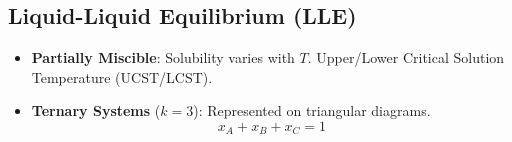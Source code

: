 \subsection{Liquid-Liquid Equilibrium (LLE)}
\begin{itemize}
    \item \textbf{Partially Miscible}: Solubility varies with $T$. Upper/Lower Critical Solution Temperature (UCST/LCST).
    \item \textbf{Ternary Systems} ($k=3$): Represented on triangular diagrams.
    \begin{equation}
        x_A + x_B + x_C = 1
    \end{equation}
\end{itemize}
\vspace{0.2cm}

